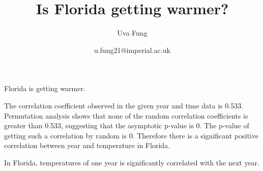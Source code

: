 \documentclass[12pt]{article}
\title{Is Florida getting warmer?}
\author{Uva Fung}
\date{u.fung21@imperial.ac.uk}
\begin{document}
  \maketitle
  

  

  Florida is getting warmer. 

  The correlation coefficient observed in the given year and time data is 0.533. 
  Permutation analysis shows that none of the random correlation coefficients is greater than 0.533, 
  suggesting that the asymptotic p-value is 0. The p-value of getting such a correlation by random is 0. 
  Therefore there is a significant positive correlation between year and temperature in Florida. 
  
  In Florida, temperatures of one year is significantly correlated with the next year. 
  

  

  

  
 
\end{document}
